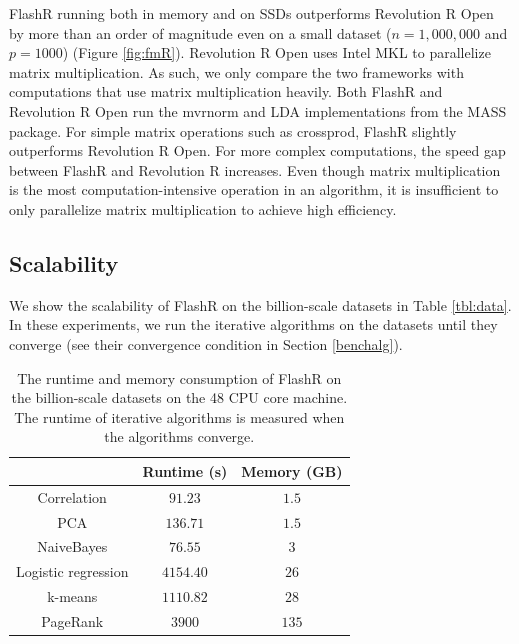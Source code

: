 FlashR running both in memory and on SSDs outperforms Revolution R Open by more
than an order of magnitude even on a small dataset ($n=1,000,000$ and $p=1000$)
(Figure \ref{fig:fmR}).
Revolution R Open uses Intel MKL to parallelize matrix multiplication. As such,
we only compare the two frameworks with computations that use matrix
multiplication heavily. Both FlashR and Revolution R Open run the mvrnorm
and LDA implementations from the MASS package. For simple matrix operations such as crossprod,
FlashR slightly outperforms Revolution R Open. For more complex computations,
the speed gap between FlashR and Revolution R increases. Even though matrix multiplication
is the most computation-intensive operation in an algorithm, it is insufficient
to only parallelize matrix multiplication to achieve high efficiency.

\subsection{Scalability}

We show the scalability of FlashR on the billion-scale datasets in Table
\ref{tbl:data}. In these experiments, we run the iterative algorithms on
the datasets until they converge (see their convergence condition in Section
\ref{benchalg}).

\begin{table}
\begin{center}
	\caption{The runtime and memory consumption of FlashR on the billion-scale
		datasets on the 48 CPU core machine. The runtime of iterative
		algorithms is measured when the algorithms converge.}
\vspace{-10pt}
\footnotesize
\begin{tabular}{|c|c|c|}
\hline
	& Runtime (s) & Memory (GB) \\
\hline
Correlation & $91.23$ & $1.5$ \\
\hline
PCA & $136.71$ & $1.5$ \\
\hline
NaiveBayes & $76.55$ & $3$ \\
\hline
Logistic regression & $4154.40$ & $26$ \\
\hline
k-means & $1110.82$ & $28$ \\
\hline
PageRank & $3900$ & $135$ \\
\hline
\end{tabular}
\normalsize
\label{tbl:scale}
\end{center}
\end{table}

